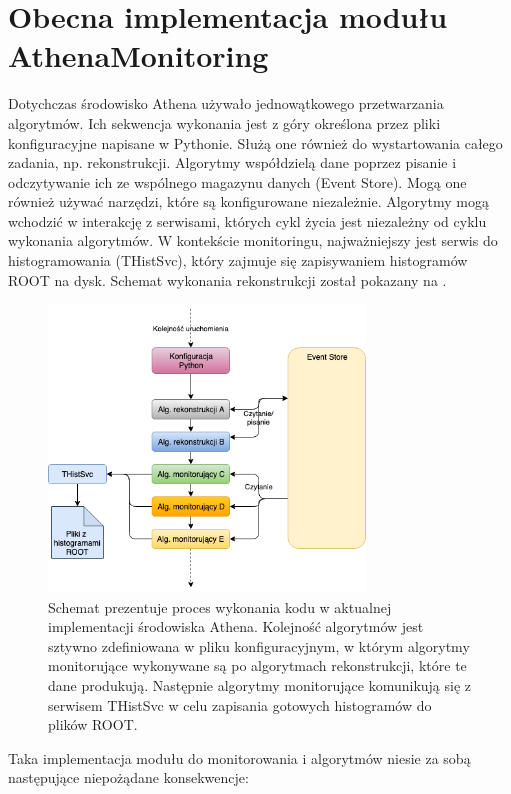 \section{Obecna implementacja modułu AthenaMonitoring}
Dotychczas środowisko Athena używało jednowątkowego przetwarzania algorytmów. 
Ich sekwencja wykonania jest z góry określona przez pliki konfiguracyjne napisane w Pythonie. 
Służą one również do wystartowania całego zadania, np. rekonstrukcji. 
Algorytmy współdzielą dane poprzez pisanie i odczytywanie ich ze wspólnego magazynu danych (Event Store). 
Mogą one również używać narzędzi, które są konfigurowane niezależnie. 
Algorytmy mogą wchodzić w interakcję z serwisami, których cykl życia jest niezależny od cyklu wykonania algorytmów.
W kontekście monitoringu, najważniejszy jest serwis do histogramowania (THistSvc), który zajmuje się zapisywaniem histogramów ROOT na dysk. 
Schemat wykonania rekonstrukcji został pokazany na .

\begin{figure}[!ht]
\centering
\includegraphics[width=0.75\textwidth]{img/old_flow.png}
\caption{
Schemat prezentuje proces wykonania kodu w aktualnej implementacji środowiska Athena. 
Kolejność algorytmów jest sztywno zdefiniowana w pliku konfiguracyjnym, w którym algorytmy monitorujące wykonywane są po algorytmach rekonstrukcji, które te dane produkują. 
Następnie algorytmy monitorujące komunikują się z serwisem THistSvc w celu zapisania gotowych histogramów do plików ROOT.
}
\label{fig:athena:oldFlow}
\end{figure}

Taka implementacja modułu do monitorowania i algorytmów niesie za sobą następujące niepożądane konsekwencje:

